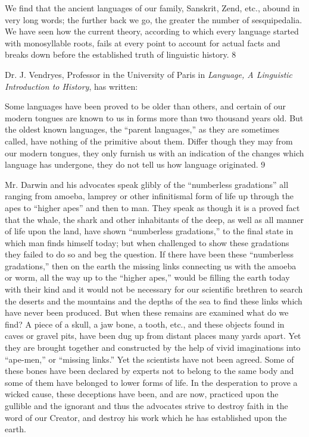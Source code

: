 We find that the ancient languages of our family, Sanskrit, Zend, etc., abound in very long
words; the further back we go, the greater the number of sesquipedalia. We have seen how
the current theory, according to which every language started with monosyllable roots, fails
at every point to account for actual facts and breaks down before the established truth of
linguistic history. 8

Dr. J. Vendryes, Professor in the University of Paris in \textit{Language, A Linguistic Introduction
to History}, has written:

Some languages have been proved to be older than others, and certain of our modern tongues
are known to us in forms more than two thousand years old. But the oldest known languages,
the ``parent languages,'' as they are sometimes called, have nothing of the primitive about
them. Differ though they may from our modern tongues, they only furnish us with an
indication of the changes which language has undergone, they do not tell us how language
originated. 9

Mr. Darwin and his advocates speak glibly of the ``numberless gradations'' all ranging from
amoeba, lamprey or other infinitismal form of life up through the apes to ``higher apes'' and
then to man. They speak as though it is a proved fact that the whale, the shark and other
inhabitants of the deep, as well as all manner of life upon the land, have shown ``numberless
gradations,'' to the final state in which man finds himself today; but when challenged to show
these gradations they failed to do so and beg the question. If there have been these
``numberless gradations,'' then on the earth the missing links connecting us with the amoeba
or worm, all the way up to the ``higher apes,'' would be filling the earth today with their kind
and it would not be necessary for our scientific brethren to search the deserts and the
mountains and the depths of the sea to find these links which have never been produced. But
when these remains are examined what do we find? A piece of a skull, a jaw bone, a tooth,
etc., and these objects found in caves or gravel pits, have been dug up from distant places
many yards apart. Yet they are brought together and constructed by the help of vivid
imaginations into ``ape-men,'' or ``missing links.'' Yet the scientists have not been agreed.
Some of these bones have been declared by experts not to belong to the same body and some
of them have belonged to lower forms of life. In the desperation to prove a wicked cause,
these deceptions have been, and are now, practiced upon the gullible and the ignorant and
thus the advocates strive to destroy faith in the word of our Creator, and destroy his work
which he has established upon the earth.

